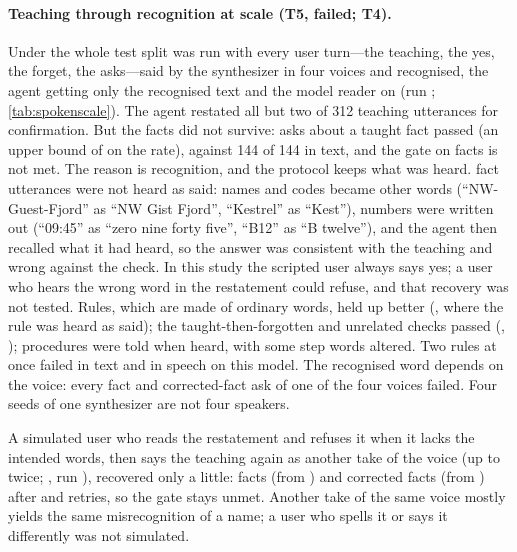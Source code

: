 \paragraph{Teaching through recognition at scale (T5, failed; T4).}
Under  the whole test split was run with every user turn---the teaching, the yes, the forget, the asks---said by the synthesizer in four voices and recognised, the agent getting only the recognised text and the model reader on (run ; \cref{tab:spokenscale}).
The agent restated all but two of 312 teaching utterances for confirmation. But the facts did not survive: \SpokenFactPass{} asks about a taught fact passed (an upper bound of \SpokenFactLow{} on the rate), against 144 of 144 in text, and the gate on facts is not met. The reason is recognition, and the protocol keeps what was heard. \SpokenFactMisheard{} fact utterances were not heard as said:
names and codes became other words (``NW-Guest-Fjord'' as ``NW Gist Fjord'', ``Kestrel'' as ``Kest''), numbers were written out (``09:45'' as ``zero nine forty five'', ``B12'' as ``B twelve''), and the agent then recalled what it had heard, so the answer was consistent with the teaching and wrong against the check. In this study the scripted user always says yes; a user who hears the wrong word in the restatement could refuse, and that recovery was not tested.
Rules, which are made of ordinary words, held up better (\SpokenRulePass{}, \SpokenRuleExact{} where the rule was heard as said); the taught-then-forgotten and unrelated checks passed (\SpokenRetractPass{}, \SpokenUnrelatedPass{}); procedures were told when heard, with some step words altered. Two rules at once failed in text and in speech on this model.
The recognised word depends on the voice: every fact and corrected-fact ask of one of the four voices failed. Four seeds of one synthesizer are not four speakers.

A simulated user who reads the restatement and refuses it when it lacks the intended words, then says the teaching again as another take of the voice (up to twice; , run ), recovered only a little: facts \RecoveryFactPass{} (from \SpokenFactPass{}) and corrected facts \RecoveryCorrectionPass{} (from \SpokenCorrectionPass{}) after \RecoveryFactRetries{} and \RecoveryCorrectionRetries{} retries, so the gate stays unmet. Another take of the same voice mostly yields the same misrecognition of a name; a user who spells it or says it differently was not simulated.

